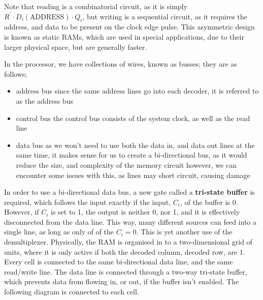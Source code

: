 \documentclass[a4paper, 12pt]{article}
\begin{document}
            Note that reading is a combinatorial circuit, as it is simply $R^\prime \cdot D_i(\text{ADDRESS}) \cdot Q_i$, but writing is a sequential circuit, as it requires the address, and data to be present on the clock edge pulse. This asymmetric design is known as static RAMs, which are used in special applications, due to their larger physical space, but are generally faster.
            \medskip

            In the processor, we have collections of wires, known as busses; they are as follows;
            \begin{itemize}
                \itemsep0em
                \item address bus
                    \subitem since the same address lines go into each decoder, it is referred to as the address bus
                \item control bus
                    \subitem the control bus consists of the system clock, as well as the read line
                \item data bus
                    \subitem as we won't need to use both the data in, and data out lines at the same time, it makes sense for us to create a bi-directional bus, as it would reduce the size, and complexity of the memory circuit
                    \subitem however, we can encounter some issues with this, as lines may short circuit, causing damage
            \end{itemize}
            In order to use a bi-directional data bus, a new gate called a \textbf{tri-state buffer} is required, which follows the input exactly if the input, $C_i$, of the buffer is 0. However, if $C_i$ is set to 1, the output is neither 0, nor 1, and it is effectively disconnected from the data line. This way, many different sources can feed into a single line, as long as only of of the $C_i=0$. This is yet another use of the demultiplexer. Physically, the RAM is organised in to a two-dimensional grid of units, where it is only active if both the decoded column, decoded row, are 1. Every cell is connected to the same bi-directional data line, and the same read/write line. The data line is connected through a two-way tri-state buffer, which prevents data from flowing in, or out, if the buffer isn't enabled. The following diagram is connected to each cell.
\end{document}
